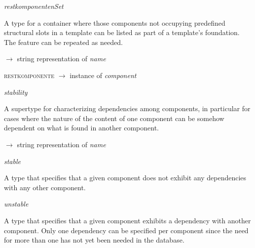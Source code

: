 \begin{ontologytop}
\begin{classlist}
\begin{classlist}
\begin{classlist}
			\end{classlist}

		\end{classlist}

	\end{classlist}

\item \emph{restkomponentenSet}
\hspace{1em}\parbox[t]{\linegoal}{\footnotesize A type for a container where those components not occupying predefined structural slots in a template can be listed as part of a template's foundation. The  feature can be repeated as needed.}


	\begin{proplist}

	\item \textsc{\name} $\rightarrow$ string representation of \emph{name}

	\item \textsc{restkomponente} $\rightarrow$ instance of \emph{component}

	\end{proplist}

\item \emph{stability}
\hspace{1em}\parbox[t]{\linegoal}{\footnotesize A supertype for characterizing dependencies among components, in particular for cases where the nature of the content of one component can be somehow dependent on what is found in another component.}


	\begin{proplist}

	\item \textsc{\name} $\rightarrow$ string representation of \emph{name}

	\end{proplist}

	\begin{classlist}

	\item \emph{stable}
	\hspace{1em}\parbox[t]{\linegoal}{\footnotesize A type that specifies that a given component does not exhibit any  dependencies with any other component.}


	\item \emph{unstable}
	\hspace{1em}\parbox[t]{\linegoal}{\footnotesize A type that specifies that a given component exhibits a dependency with another component. Only one dependency can be specified per component since the need for more than one has not yet been needed in the database.}



\end{classlist}
\end{ontologytop}
